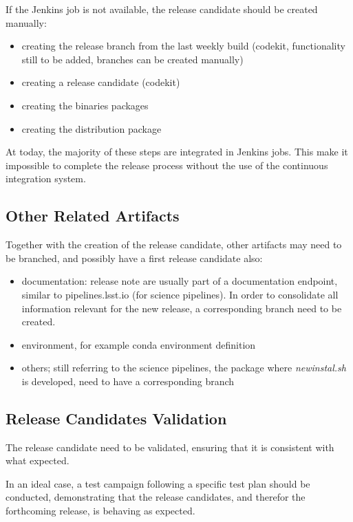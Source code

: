 If the Jenkins job is not available, the release candidate should be created manually:

\begin{itemize}
\item creating the release branch from the last weekly build (codekit, functionality still to be added, branches can be created manually)
\item creating a release candidate (codekit)
\item creating the binaries packages 
\item creating the distribution package
\end{itemize}

At today, the majority of these steps are integrated in Jenkins jobs. This make it impossible to complete the release process without the use of the continuous integration system.

\subsection{Other Related Artifacts}

Together with the creation of the release candidate, other artifacts may need to be branched, and possibly have a first release candidate also:

\begin{itemize}
\item documentation: release note are usually part of a documentation endpoint, similar to pipelines.lsst.io (for science pipelines). In order to consolidate all information relevant for the new release, a corresponding branch need to be created.
\item environment, for example conda environment definition
\item others; still referring to the science pipelines, the package where \textit{newinstal.sh} is developed, need to have a corresponding branch
\end{itemize}


\subsection{Release Candidates Validation} \label{sect:rcvalidation}

The release candidate need to be validated, ensuring that it is consistent with what expected.

In an ideal case, a test campaign following a specific test plan should be conducted, demonstrating that the release candidates, and therefor the forthcoming release, is behaving as expected.

